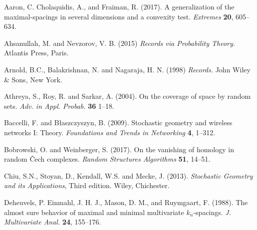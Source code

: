 \documentclass[12pt]{article}
\begin{document}
\begin{thebibliography}{}

Aaron, C.  Cholaquidis, A., and Fraiman, R.
(2017). 
A generalization of the maximal-spacings in several dimensions and a 
convexity test. 
{\em Extremes} {\bf  20}, 605--634. 

Ahsanullah, M.
		and Nevzorov, V. B. (2015)
		{\em Records via Probability Theory.}
Atlantis Press, Paris. 

Arnold, B.C., Balakrishnan, N. and Nagaraja, H. N.
		(1998)
		{\em Records.}
John Wiley \& Sons, %
		New York.



Athreya, S., Roy, R. and  Sarkar, A. (2004).
On the coverage of space by random sets. 
{\em Adv. in Appl. Probab. }{\bf 36} 1--18. 

Baccelli, F. and B\l aszczyszyn, B. (2009).
Stochastic geometry and wireless networks I: Theory.
{\em Foundations and Trends in Networking} {\bf 4}, 1--312. 

        Bobrowski, O. and Weinberger, S.
                (2017).
                On the vanishing of homology in random \v{C}ech
                complexes. {\em Random Structures Algorithms}
                {\bf 51}, 14--51.



Chiu, S.N., Stoyan, D., Kendall, W.S. and Mecke, J.
(2013).
{\em Stochastic Geometry and its Applications},
Third edition.
 Wiley, Chichester.




Deheuvels, P.
 Einmahl, J. H. J.,
 Mason, D. M., and Ruymgaart, F. (1988).
The almost sure behavior of maximal and minimal multivariate $k_n$-spacings.
{\em J. Multivariate Anal.} {\bf 24},  155--176. 


\end{thebibliography}
\end{document}
